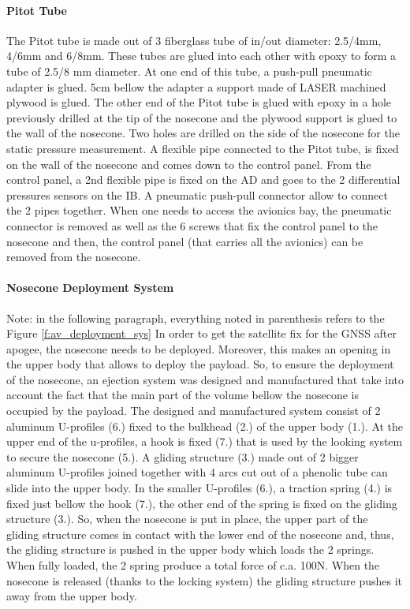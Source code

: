 \paragraph{Pitot Tube}
The Pitot tube is made out of 3 fiberglass tube of in/out diameter: 2.5/4mm, 4/6mm and 6/8mm. These tubes are glued into each other with epoxy to form a tube of 2.5/8 mm diameter. At one end of this tube, a push-pull pneumatic adapter is glued. 5cm bellow the adapter a support made of LASER machined plywood is glued. The other end of the Pitot tube is glued with epoxy in a hole previously drilled at the tip of the nosecone and the plywood support is glued to the wall of the nosecone. Two holes are drilled on the side of the nosecone for the static pressure measurement.
A flexible pipe connected to the Pitot tube, is fixed on the wall of the nosecone and comes down to the control panel. From the control panel, a 2nd flexible pipe is fixed on the AD and goes to the 2 differential pressures sensors on the IB. A pneumatic push-pull connector allow to connect the 2 pipes together. When one needs to access the avionics bay, the pneumatic connector is removed as well as the 6 screws that fix the control panel to the nosecone and then, the control panel (that carries all the avionics) can be removed from the nosecone.

\paragraph{Nosecone Deployment System}
Note: in the following paragraph, everything noted in parenthesis refers to the Figure \ref{f:av_deployment_sys}
In order to get the satellite fix for the GNSS after apogee, the nosecone needs to be deployed. Moreover, this makes an opening in the upper body that allows to deploy the payload. So, to ensure the deployment of the nosecone, an ejection system was designed and manufactured that take into account the fact that the
main part of the volume bellow the nosecone is occupied by the payload.
The designed and manufactured system consist of 2 aluminum U-profiles (6.) fixed to the bulkhead (2.) of the upper body (1.). At the upper end of the u-profiles, a hook is fixed (7.) that is used by the looking system to secure the nosecone (5.). A gliding structure (3.) made out of 2 bigger aluminum U-profiles joined together with 4 arcs cut out of a phenolic tube can slide into the upper body.
In the smaller U-profiles (6.), a traction spring (4.) is fixed just bellow the hook (7.), the other end of the spring is fixed on the gliding structure (3.). So, when the nosecone is put in place, the upper part of the gliding structure comes in contact with the lower end of the nosecone and, thus, the gliding structure is pushed in the upper body which loads the 2 springs. When fully loaded, the 2 spring produce a total force of c.a. 100N. When the nosecone is released (thanks to the locking system) the gliding structure pushes it away from the upper body.

